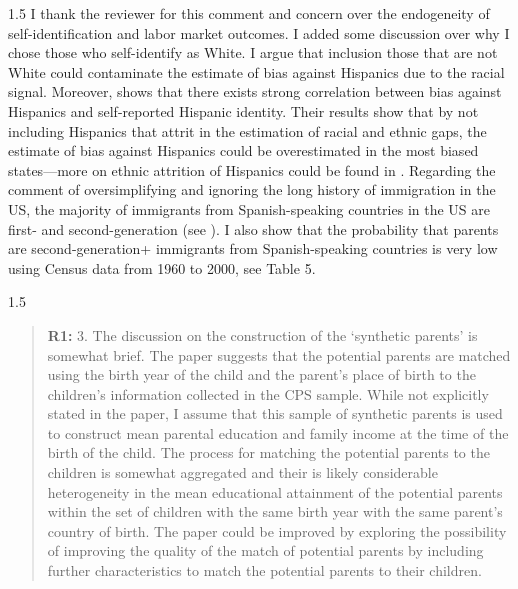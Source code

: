 \documentclass[12pt,english]{article}
\newcommand{\rrxspc}{1.5}
\begin{document}
\begin{refsection}
    \begin{spacing}{\rrxspc}
        I thank the reviewer for this comment and concern over the endogeneity of self-identification and labor market outcomes. I added some discussion over why I chose those who self-identify as White. I argue that inclusion those that are not White could contaminate the estimate of bias against Hispanics due to the racial signal. Moreover, \autocite{hadah2024effect} shows that there exists strong correlation between bias against Hispanics and self-reported Hispanic identity. Their results show that by not including Hispanics that attrit in the estimation of racial and ethnic gaps, the estimate of bias against Hispanics could be overestimated in the most biased states---more on ethnic attrition of Hispanics could be found in \textcite{antmanEthnicAttritionObserved2016,antmanEthnicAttritionAssimilation2020}. Regarding the comment of oversimplifying and ignoring the long history of immigration in the US, the majority of immigrants from Spanish-speaking countries in the US are first- and second-generation (see \autocite{antman2020ethnic}). I also show that the probability that parents are second-generation+ immigrants from Spanish-speaking countries is very low using Census data from 1960 to 2000, see Table 5. 
    \end{spacing}    

    \begin{spacing}{\rrxspc}
        \begin{quotation}
            \textbf{R1: } 3. The discussion on the construction of the ‘synthetic parents’ is somewhat brief. The paper suggests that the potential parents are matched using the birth year of the child and the parent’s place of birth to the children’s information collected in the CPS sample. While not explicitly stated in the paper, I assume that this sample of synthetic parents is used to construct mean parental education and family income at the time of the birth of the child. The process for matching the potential parents to the children is somewhat aggregated and their is likely considerable heterogeneity in the mean educational attainment of the potential parents within the set of children with the same birth year with the same parent’s country of birth. The paper could be improved by exploring the possibility of improving the quality of the match of potential parents by including further characteristics to match the potential parents to their children.
    \end{quotation}
        \end{spacing}
            

\end{refsection}
\end{document}
